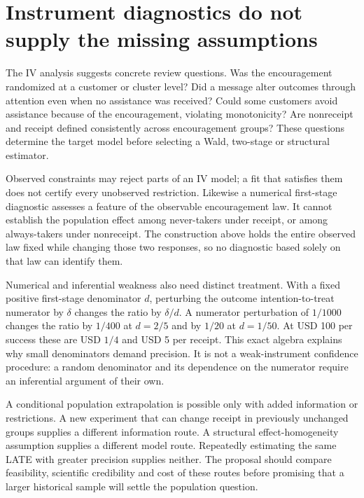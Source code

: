 \section{Instrument diagnostics do not supply the missing assumptions}

The IV analysis suggests concrete review questions. Was the
encouragement randomized at a customer or cluster level? Did a
message alter outcomes through attention even when no assistance
was received? Could some customers avoid assistance because of
the encouragement, violating monotonicity? Are nonreceipt and
receipt defined consistently across encouragement groups? These
questions determine the target model before selecting a Wald,
two-stage or structural estimator.

Observed constraints may reject parts of an IV model; a fit that
satisfies them does not certify every unobserved restriction.
Likewise a numerical first-stage diagnostic assesses a feature
of the observable encouragement law. It cannot establish the
population effect among never-takers under receipt, or among
always-takers under nonreceipt. The construction above holds
the entire observed law fixed while changing those two
responses, so no diagnostic based solely on that law can
identify them.~\citep{angrist1996,exec17_s3_exact}

Numerical and inferential weakness also need distinct treatment.
With a fixed positive first-stage denominator $d$, perturbing
the outcome intention-to-treat numerator by $\delta$ changes
the ratio by $\delta/d$. A numerator perturbation of $1/1000$
changes the ratio by $1/400$ at $d=2/5$ and by $1/20$ at
$d=1/50$. At USD 100 per success these are USD $1/4$ and
USD 5 per receipt. This exact algebra explains why small
denominators demand precision. It is not a weak-instrument
confidence procedure: a random denominator and its dependence
on the numerator require an inferential argument of their
own.~\citep{exec17_s3_exact}

A conditional population extrapolation is possible only with
added information or restrictions. A new experiment that can
change receipt in previously unchanged groups supplies a
different information route. A structural effect-homogeneity
assumption supplies a different model route. Repeatedly
estimating the same LATE with greater precision supplies
neither. The proposal should compare feasibility, scientific
credibility and cost of these routes before promising that a
larger historical sample will settle the population question.

